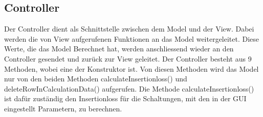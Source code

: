 \subsection{Controller} \label{subsec:controller}

Der Controller dient als Schnittstelle zwischen dem Model und der View. Dabei werden die von View aufgerufenen Funktionen an das Model weitergeleitet. Diese Werte, die das Model Berechnet hat, werden anschliessend wieder an den Controller gesendet und zurück zur View geleitet. Der Controller besteht aus 9 Methoden, wobei eine der Konstruktor ist. Von diesen Methoden wird das Model nur von den beiden Methoden calculateInsertionloss() und deleteRowInCalculationData() aufgerufen. Die Methode calculateInsertionloss() ist dafür zuständig den Insertionloss für die Schaltungen, mit den in der GUI  eingestellt Parametern, zu berechnen.  
